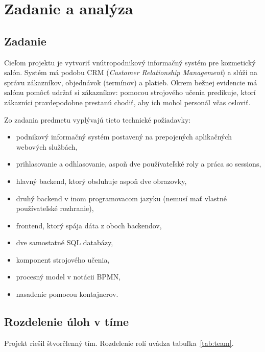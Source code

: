 
\chapter{Zadanie a analýza}\label{ch:analysis}

\section{Zadanie}

Cieľom projektu je vytvoriť vnútropodnikový informačný systém pre kozmetický salón. Systém má podobu CRM (\emph{Customer Relationship Management}) a slúži na správu zákazníkov, objednávok (termínov) a platieb. Okrem bežnej evidencie má salónu pomôcť udržať si zákazníkov: pomocou strojového učenia predikuje, ktorí zákazníci pravdepodobne prestanú chodiť, aby ich mohol personál včas osloviť.

Zo zadania predmetu vyplývajú tieto technické požiadavky:

\begin{itemize}
  \item podnikový informačný systém postavený na prepojených aplikačných webových službách,
  \item prihlasovanie a odhlasovanie, aspoň dve používateľské roly a práca so sessions,
  \item hlavný backend, ktorý obsluhuje aspoň dve obrazovky,
  \item druhý backend v inom programovacom jazyku (nemusí mať vlastné používateľské rozhranie),
  \item frontend, ktorý spája dáta z oboch backendov,
  \item dve samostatné SQL databázy,
  \item komponent strojového učenia,
  \item procesný model v notácii BPMN,
  \item nasadenie pomocou kontajnerov.
\end{itemize}

\section{Rozdelenie úloh v tíme}

Projekt riešil štvorčlenný tím. Rozdelenie rolí uvádza tabuľka~\ref{tab:team}.

